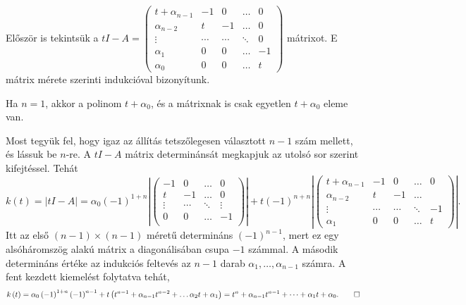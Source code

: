 \documentclass[a4paper, showtrims]{memoir}
\makeatletter
\renewenvironment{proof}[1][\proofname]
    {\par\pushQED{\qed}%
    \normalfont \topsep6\p@\@plus6\p@\relax
    \trivlist
    \item[\hskip\labelsep
        \itshape
    #1\@addpunct{:}]\ignorespaces}
    {\popQED\endtrivlist\@endpefalse}
\theoremstyle{plain}
\theoremstyle{remark}
\theoremstyle{definition}
\makeatother
\begin{document}
\begin{proof}
	Először is tekintsük a
	\(
	tI-A=
	\begin{pmatrix}
		t+\alpha_{n-1} & -1     & 0      & \dots  & 0  \\
		\alpha_{n-2}   & t      & -1     & \dots  & 0  \\
		\vdots         & \cdots & \cdots & \ddots & 0  \\
		\alpha_1       & 0      & 0      & \dots  & -1 \\
		\alpha_0       & 0      & 0      & \dots  & t
	\end{pmatrix}
	\) mátrixot.
	E mátrix mérete szerinti indukcióval bizonyítunk.

	Ha $n=1$, akkor a polinom $t+\alpha_0$, és a mátrixnak is csak egyetlen $t+\alpha_0$ eleme van.

	Most tegyük fel, hogy igaz az állítás tetszőlegesen választott $n-1$ szám mellett, és lássuk be $n$-re.
	A $tI-A$ mátrix determinánsát megkapjuk az utolsó sor szerint kifejtéssel.
	Tehát
	\[
		k\left( t \right)=
		|tI-A|=
		\alpha_0
		\left( -1 \right)^{1+n}
		\left|
		\begin{pmatrix}
			-1     & 0      & \dots  & 0      \\
			t      & -1     & \dots  & 0      \\
			\vdots & \cdots & \ddots & \vdots \\
			0      & 0      & \dots  & -1     \\
		\end{pmatrix}
		\right|
		+t\left( -1 \right)^{n+n}
		\left|
		\begin{pmatrix}
			t+\alpha_{n-1} & -1     & 0      & \dots  & 0       \\
			\alpha_{n-2}   & t      & -1     & \dots  &   \\
			\vdots         & \cdots & \cdots & \ddots & -1      \\
			\alpha_1       & 0      & 0      & \dots  & t
		\end{pmatrix}
		\right|.
	\]
	Itt az első $\left( n-1 \right)\times \left( n-1 \right)$ méretű determináns $\left( -1 \right)^{n-1}$,
	mert ez egy alsóháromszög alakú mátrix a diagonálisában csupa $-1$ számmal.
	A második determináns értéke az indukciós feltevés az $n-1$ darab
	$ \alpha_1,\ldots, \alpha_{n-1}$ számra.
	A fent kezdett kiemelést folytatva tehát,
	\[
		k\left( t \right)
		=
		\alpha_0
		\left( -1 \right)^{1+n}\left( -1 \right)^{n-1}
		+t\left(
		t^{n-1}+\alpha_{n-1}t^{n-2}+\dots\alpha_2t+\alpha_1
		\right)
		=
		t^n+\alpha_{n-1}t^{n-1}+\dots+\alpha_1t+\alpha_0.\qedhere
	\]
\end{proof}
\end{document}
